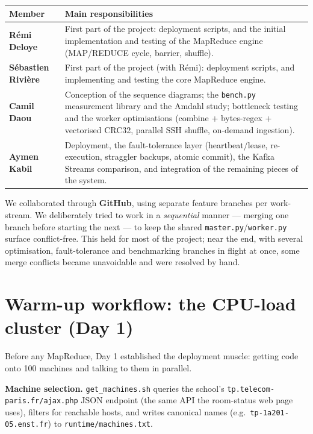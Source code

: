 \documentclass[11pt,a4paper]{article}
\newcommand{\code}[1]{\texttt{\small #1}}
\begin{document}
\begin{table}[H]
\centering
\small
\renewcommand{\arraystretch}{1.3}
\begin{tabularx}{\textwidth}{@{}lX@{}}
\toprule
\textbf{Member} & \textbf{Main responsibilities}\\
\midrule
\textbf{Rémi Deloye} & First part of the project: deployment scripts, and the
initial implementation and testing of the MapReduce engine (MAP/REDUCE cycle,
barrier, shuffle).\\
\textbf{Sébastien Rivière} & First part of the project (with Rémi): deployment
scripts, and implementing and testing the core MapReduce engine.\\
\textbf{Camil Daou} & Conception of the sequence diagrams; the \code{bench.py}
measurement library and the Amdahl study; bottleneck testing and the worker
optimisations (combine + bytes-regex + vectorised CRC32, parallel SSH shuffle,
on-demand ingestion).\\
\textbf{Aymen Kabil} & Deployment, the fault-tolerance layer (heartbeat/lease,
re-execution, straggler backups, atomic commit), the Kafka Streams comparison,
and integration of the remaining pieces of the system.\\
\bottomrule
\end{tabularx}
\end{table}

\noindent We collaborated through \textbf{GitHub}, using separate feature
branches per work-stream. We deliberately tried to work in a \emph{sequential}
manner --- merging one branch before starting the next --- to keep the shared
\code{master.py}/\code{worker.py} surface conflict-free. This held for most of
the project; near the end, with several optimisation, fault-tolerance and
benchmarking branches in flight at once, some merge conflicts became
unavoidable and were resolved by hand.

\section{Warm-up workflow: the CPU-load cluster (Day 1)}\label{sec:cpuload}

Before any MapReduce, Day 1 established the deployment muscle: getting code onto
100 machines and talking to them in parallel.

\textbf{Machine selection.} \code{get\_machines.sh} queries the school's
\code{tp.telecom-paris.fr/ajax.php} JSON endpoint (the same API the room-status
web page uses), filters for reachable hosts, and writes canonical names
(e.g.\ \code{tp-1a201-05.enst.fr}) to \code{runtime/machines.txt}.
\end{document}
